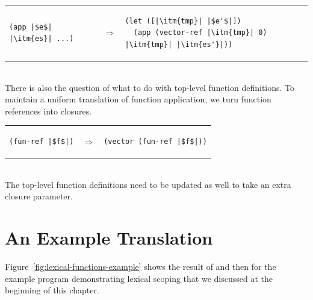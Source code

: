 \documentclass[11pt]{book}
\begin{document}
\begin{tabular}{lll}
\begin{minipage}{0.3\textwidth}
\begin{lstlisting}
(app |$e$| |\itm{es}| ...)
\end{lstlisting}
\end{minipage}
&
$\Rightarrow$
&
\begin{minipage}{0.5\textwidth}
\begin{lstlisting}
(let ([|\itm{tmp}| |$e'$|])
  (app (vector-ref |\itm{tmp}| 0) |\itm{tmp}| |\itm{es'}|))
\end{lstlisting}
\end{minipage}
\end{tabular}  \\

There is also the question of what to do with top-level function
definitions. To maintain a uniform translation of function
application, we turn function references into closures.

\begin{tabular}{lll}
\begin{minipage}{0.3\textwidth}
\begin{lstlisting}
(fun-ref |$f$|)
\end{lstlisting}
\end{minipage}
&
$\Rightarrow$
&
\begin{minipage}{0.5\textwidth}
\begin{lstlisting}
(vector (fun-ref |$f$|))
\end{lstlisting}
\end{minipage}
\end{tabular}  \\
%
The top-level function definitions need to be updated as well to take
an extra closure parameter.

\section{An Example Translation}
\label{sec:example-lambda}

Figure~\ref{fig:lexical-functions-example} shows the result of
 and then  for the
example program demonstrating lexical scoping that we discussed at the
beginning of this chapter.
\end{document}
